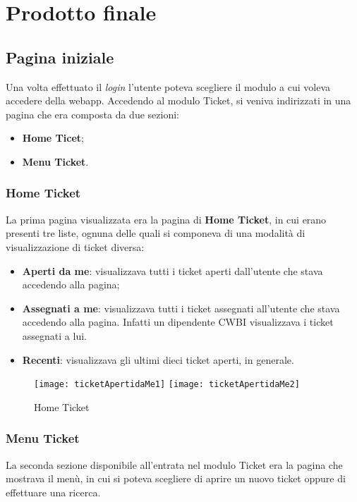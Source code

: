 \chapter{Prodotto finale}
\label{cap:prodotto finale}

\section{Pagina iniziale}
Una volta effettuato il \textit{login} l'utente poteva scegliere il modulo a cui voleva accedere della webapp. Accedendo al modulo Ticket, si veniva indirizzati in una pagina che era composta da due sezioni:
\begin{itemize}
\item \textbf{Home Ticet};
\item \textbf{Menu Ticket}.
\end{itemize}

\subsection{Home Ticket}
La prima pagina visualizzata era la pagina di \textbf{Home Ticket}, in cui erano presenti tre liste, ognuna delle quali si componeva di una modalità di visualizzazione di ticket diversa:
\begin{itemize}
\item \textbf{Aperti da me}: visualizzava tutti i ticket aperti dall'utente che stava accedendo alla pagina;
\item \textbf{Assegnati a me}: visualizzava tutti i ticket assegnati all'utente che stava accedendo alla pagina. Infatti un dipendente CWBI visualizzava i ticket assegnati a lui.
\item \textbf{Recenti}: visualizzava gli ultimi dieci ticket aperti, in generale.
\end{itemize}

\begin{figure}[H]
	\centering
    \texttt{[image: ticketApertidaMe1]} 
    \texttt{[image: ticketApertidaMe2]} 
    \caption{Home Ticket}
\end{figure}

\subsection{Menu Ticket}
La seconda sezione disponibile all'entrata nel modulo Ticket era la pagina che mostrava il menù, in cui si poteva scegliere di aprire un nuovo ticket oppure di effettuare una ricerca.
 
